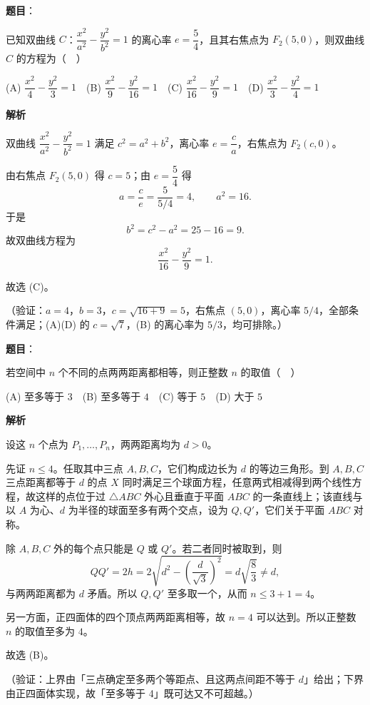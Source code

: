 \begin{answer}

\textbf{题目}：

已知双曲线 \(C\)：\(\dfrac{x^2}{a^2}-\dfrac{y^2}{b^2}=1\) 的离心率 \(e=\dfrac{5}{4}\)，且其右焦点为 \(F_2(5,0)\)，则双曲线 \(C\) 的方程为（　）

(A) \(\dfrac{x^2}{4}-\dfrac{y^2}{3}=1\)　(B) \(\dfrac{x^2}{9}-\dfrac{y^2}{16}=1\)　(C) \(\dfrac{x^2}{16}-\dfrac{y^2}{9}=1\)　(D) \(\dfrac{x^2}{3}-\dfrac{y^2}{4}=1\)

\textbf{解析}

双曲线 \(\dfrac{x^2}{a^2}-\dfrac{y^2}{b^2}=1\) 满足 \(c^2=a^2+b^2\)，离心率 \(e=\dfrac{c}{a}\)，右焦点为 \(F_2(c,0)\)。

由右焦点 \(F_2(5,0)\) 得 \(c=5\)；由 \(e=\dfrac54\) 得
\nopagebreak[4]
\[
a=\frac{c}{e}=\frac{5}{5/4}=4,\qquad a^2=16.
\]
于是
\nopagebreak[4]
\[
b^2=c^2-a^2=25-16=9.
\]
故双曲线方程为
\nopagebreak[4]
\[
\frac{x^2}{16}-\frac{y^2}{9}=1.
\]

故选 (C)。

（验证：\(a=4\)，\(b=3\)，\(c=\sqrt{16+9}=5\)，右焦点 \((5,0)\)，离心率 \(5/4\)，全部条件满足；(A)(D) 的 \(c=\sqrt7\)，(B) 的离心率为 \(5/3\)，均可排除。）


\end{answer}
\begin{answer}

\textbf{题目}：

若空间中 \(n\) 个不同的点两两距离都相等，则正整数 \(n\) 的取值（　）

(A) 至多等于 \(3\)　(B) 至多等于 \(4\)　(C) 等于 \(5\)　(D) 大于 \(5\)

\textbf{解析}

设这 \(n\) 个点为 \(P_1,\dots,P_n\)，两两距离均为 \(d>0\)。

先证 \(n\leqslant4\)。任取其中三点 \(A,B,C\)，它们构成边长为 \(d\) 的等边三角形。到 \(A,B,C\) 三点距离都等于 \(d\) 的点 \(X\) 同时满足三个球面方程，任意两式相减得到两个线性方程，故这样的点位于过 \(\triangle ABC\) 外心且垂直于平面 \(ABC\) 的一条直线上；该直线与以 \(A\) 为心、\(d\) 为半径的球面至多有两个交点，设为 \(Q,Q'\)，它们关于平面 \(ABC\) 对称。

除 \(A,B,C\) 外的每个点只能是 \(Q\) 或 \(Q'\)。若二者同时被取到，则
\nopagebreak[4]
\[
QQ'=2h=2\sqrt{d^2-\left(\frac{d}{\sqrt3}\right)^2}=d\sqrt{\frac83}\ne d,
\]
与两两距离都为 \(d\) 矛盾。所以 \(Q,Q'\) 至多取一个，从而 \(n\leqslant3+1=4\)。

另一方面，正四面体的四个顶点两两距离相等，故 \(n=4\) 可以达到。所以正整数 \(n\) 的取值至多为 \(4\)。

故选 (B)。

（验证：上界由「三点确定至多两个等距点、且这两点间距不等于 \(d\)」给出；下界由正四面体实现，故「至多等于 4」既可达又不可超越。）


\end{answer}
